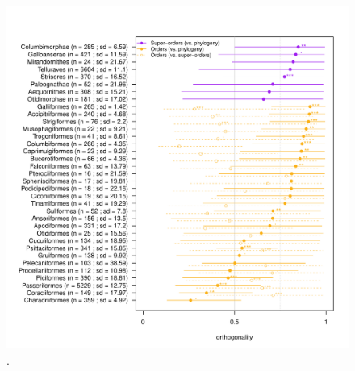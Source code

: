 \documentclass[12pt,letterpaper]{article}
\providecommand{\DIFdelbegin}{} %
\providecommand{\DIFdelend}{} %
\providecommand{\DIFaddbeginFL}{} %
\providecommand{\DIFaddendFL}{} %
\providecommand{\DIFdelbeginFL}{} %
\providecommand{\DIFdelendFL}{} %
\newcommand{\DIFscaledelfig}{0.5}
\newlength{\DIFdelgraphicswidth} %
\newlength{\DIFdelgraphicsheight} %
\newcommand{\DIFaddincludegraphics}[2][]{{\color{blue}\fbox{\DIFOincludegraphics[#1]{#2}}}} %
\newcommand{\DIFdelincludegraphics}[2][]{%
\sbox{\DIFdelgraphicsbox}{\DIFOincludegraphics[#1]{#2}}%
\settoboxwidth{\DIFdelgraphicswidth}{\DIFdelgraphicsbox} %
\settoboxtotalheight{\DIFdelgraphicsheight}{\DIFdelgraphicsbox} %
\scalebox{\DIFscaledelfig}{%
\parbox[b]{\DIFdelgraphicswidth}{\usebox{\DIFdelgraphicsbox}\\[-\baselineskip] \rule{\DIFdelgraphicswidth}{0em}}\llap{\resizebox{\DIFdelgraphicswidth}{\DIFdelgraphicsheight}{%
\setlength{\unitlength}{\DIFdelgraphicswidth}%
\begin{picture}(1,1)%
\thicklines\linethickness{2pt} %
{\color[rgb]{1,0,0}\put(0,0){\framebox(1,1){}}}%
{\color[rgb]{1,0,0}\put(0,0){\line( 1,1){1}}}%
{\color[rgb]{1,0,0}\put(0,1){\line(1,-1){1}}}%
\end{picture}%
}\hspace*{3pt}}} %
} %
\DeclareRobustCommand{\DIFdelbegin}{\DIFOdelbegin \let\includegraphics\DIFdelincludegraphics} %
\DeclareRobustCommand{\DIFdelend}{\DIFOaddend \let\includegraphics\DIFOincludegraphics} %
\DeclareRobustCommand{\DIFaddbeginFL}{\DIFOaddbeginFL \let\includegraphics\DIFaddincludegraphics} %
\DeclareRobustCommand{\DIFaddendFL}{\DIFOaddendFL \let\includegraphics\DIFOincludegraphics} %
\DeclareRobustCommand{\DIFdelbeginFL}{\DIFOdelbeginFL \let\includegraphics\DIFdelincludegraphics} %
\DeclareRobustCommand{\DIFdelendFL}{\DIFOaddendFL \let\includegraphics\DIFOincludegraphics} %
\begin{document}
\DIFdelbegin %


\DIFdelend \begin{figure}[!htbp]
\centering
   \DIFdelbeginFL %
\DIFdelendFL \DIFaddbeginFL \includegraphics[width=1\textwidth]{Figures/orthogonality_results.pdf}
\DIFaddendFL \caption{.}
\label{Fig:orthogonality}
\end{figure}
\DIFdelbegin %

\DIFdelend \bigskip
\end{document}
